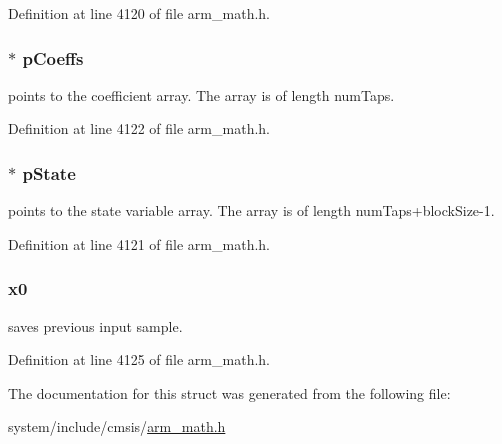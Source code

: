 Definition at line 4120 of file arm\+\_\+math.\+h.

\subsubsection[{\texorpdfstring{p\+Coeffs}{pCoeffs}}]{$\ast$ p\+Coeffs}\hypertarget{structarm__lms__norm__instance__f32_aacbb8dd8eeba4b21fc2bb40076405ee3}{}\label{structarm__lms__norm__instance__f32_aacbb8dd8eeba4b21fc2bb40076405ee3}
points to the coefficient array. The array is of length num\+Taps. 

Definition at line 4122 of file arm\+\_\+math.\+h.

\subsubsection[{\texorpdfstring{p\+State}{pState}}]{$\ast$ p\+State}\hypertarget{structarm__lms__norm__instance__f32_a335c87e6fdc4b96601d95a5de8b9c463}{}\label{structarm__lms__norm__instance__f32_a335c87e6fdc4b96601d95a5de8b9c463}
points to the state variable array. The array is of length num\+Taps+block\+Size-\/1. 

Definition at line 4121 of file arm\+\_\+math.\+h.

\subsubsection[{\texorpdfstring{x0}{x0}}]{ x0}\hypertarget{structarm__lms__norm__instance__f32_ab56b6f83c5b324c3ef620474b6e5a6e1}{}\label{structarm__lms__norm__instance__f32_ab56b6f83c5b324c3ef620474b6e5a6e1}
saves previous input sample. 

Definition at line 4125 of file arm\+\_\+math.\+h.



The documentation for this struct was generated from the following file\+:\begin{DoxyCompactItemize}
\item 
system/include/cmsis/\hyperlink{arm__math_8h}{arm\+\_\+math.\+h}\end{DoxyCompactItemize}
